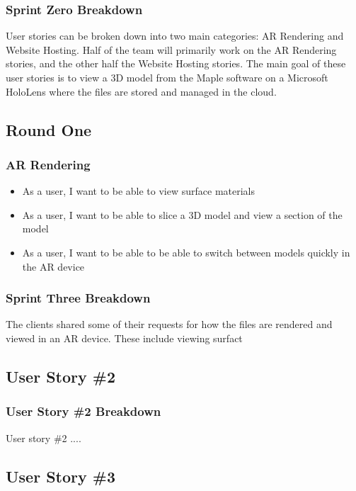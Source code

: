 \subsubsection{Sprint Zero Breakdown}
User stories can be broken down into two main categories: AR Rendering and Website Hosting.  Half of the team will primarily work on 
the AR Rendering stories, and the other half the Website Hosting stories.  The main goal of these user stories is to view a
3D model from the Maple software on a Microsoft HoloLens where the files are stored and managed in the cloud.

\subsection{Round One}

\subsubsection{AR Rendering}

\begin{itemize}
	\item As a user, I want to be able to view surface materials
	\item As a user, I want to be able to slice a 3D model and view a section of the model
	\item As a user, I want to be able to be able to switch between models quickly in the AR device
\end{itemize}

\subsubsection{Sprint Three Breakdown}

The clients shared some of their requests for how the files are rendered and viewed in an AR device.  These include viewing surfact

\subsection{User Story \#2} 

\subsubsection{User Story \#2 Breakdown}
User story \#2  .... 

\subsection{User Story \#3} 


